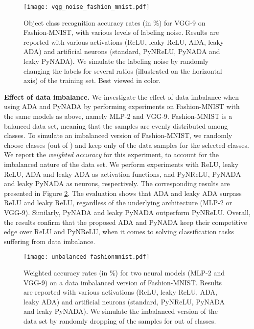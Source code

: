 \documentclass[pdflatex,sn-mathphys]{sn-jnl}
\theoremstyle{thmstyleone}
\theoremstyle{thmstyletwo}\newtheorem{example}{Example}\newtheorem{remark}{Remark}
\theoremstyle{thmstylethree}\newtheorem{definition}{Definition}\DeclareMathOperator{\sinc}{sinc}
\begin{document}
\begin{figure} 
\begin{center}
\centerline{\texttt{[image: vgg\_noise\_fashion\_mnist.pdf]}}
\caption{Object class recognition accuracy rates (in \%) for VGG-9 on Fashion-MNIST, with various levels of labeling noise. Results are reported with various activations (ReLU, leaky ReLU, ADA, leaky ADA) and artificial neurons (standard, PyNReLU, PyNADA and leaky PyNADA). We simulate the labeling noise by randomly changing the labels for several ratios (illustrated on the horizontal axis) of the training set. Best viewed in color.}\label{noise_vgg_fashion_mnist}
\end{center}
\end{figure}

\noindent
{\bf Effect of data imbalance.} We investigate the effect of data imbalance when using ADA and PyNADA by performing experiments on Fashion-MNIST with the same models as above, namely MLP-2 and VGG-9. Fashion-MNIST is a balanced data set, meaning that the samples are evenly distributed among classes. To simulate an imbalanced version of Fashion-MNIST, we randomly choose  classes (out of ) and keep only  of the data samples for the selected classes. We report the \textit{weighted accuracy} for this experiment, to account for the imbalanced nature of the data set. We perform experiments with ReLU, leaky ReLU, ADA and leaky ADA as activation functions, and PyNReLU, PyNADA and leaky PyNADA as neurons, respectively. The corresponding results are presented in Figure \ref{imbalanced_fashion_mnist}. The evaluation shows that ADA and leaky ADA surpass ReLU and leaky ReLU, regardless of the underlying architecture (MLP-2 or VGG-9). Similarly, PyNADA and leaky PyNADA outperform PyNReLU. Overall, the results confirm that the proposed ADA and PyNADA keep their competitive edge over ReLU and PyNReLU, when it comes to solving classification tasks suffering from data imbalance.

\begin{figure} 
\begin{center}
\centerline{\texttt{[image: unbalanced\_fashionmnist.pdf]}}
\caption{Weighted accuracy rates (in \%) for two neural models (MLP-2 and VGG-9) on a data imbalanced version of Fashion-MNIST. Results are reported with various activations (ReLU, leaky ReLU, ADA, leaky ADA) and artificial neurons (standard, PyNReLU, PyNADA and leaky PyNADA). We simulate the imbalanced version of the data set by randomly dropping  of the samples for  out of  classes.}\label{imbalanced_fashion_mnist}
\end{center}
\end{figure}
 
\end{document}
